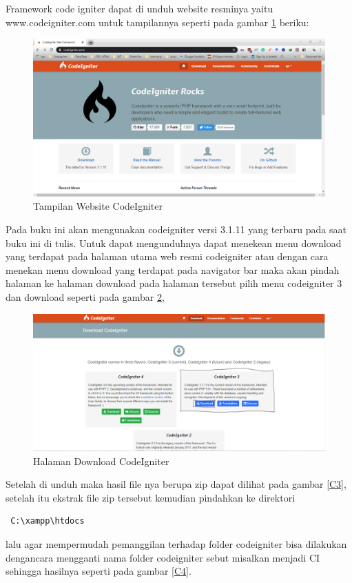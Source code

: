 Framework code igniter dapat di unduh website resminya yaitu www.codeigniter.com untuk tampilannya seperti pada gambar \ref{C1} beriku:\par
\begin{figure}[!htbp]
	\centerline{\includegraphics[width=1\textwidth]{figures/ci/1.png}}
	\caption{Tampilan Website CodeIgniter}
	\label{C1}
\end{figure}
Pada buku ini akan mengunakan codeigniter versi 3.1.11 yang terbaru pada saat buku ini di tulis. Untuk dapat mengunduhnya dapat menekean menu download yang terdapat pada halaman utama web resmi codeigniter atau dengan cara menekan menu download yang terdapat pada navigator bar maka akan pindah halaman ke halaman download pada halaman tersebut pilih menu codeigniter 3 dan download seperti pada gambar \ref{C2},
\begin{figure}[!htbp]
	\centerline{\includegraphics[width=1\textwidth]{figures/ci/2.png}}
	\caption{Halaman Download CodeIgniter}
	\label{C2}
\end{figure}
Setelah di unduh maka hasil file nya berupa zip dapat dilihat pada gambar \ref{C3}, setelah itu ekstrak file zip tersebut kemudian pindahkan ke direktori \begin{verbatim} C:\xampp\htdocs\end{verbatim} lalu agar mempermudah pemanggilan terhadap folder codeigniter bisa dilakukan dengancara mengganti nama folder codeigniter sebut misalkan menjadi CI sehingga hasilnya seperti pada gambar \ref{C4}.\par
